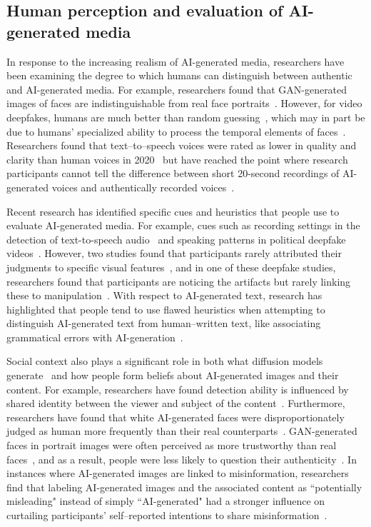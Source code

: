 \subsection{Human perception and evaluation of AI-generated media}

In response to the increasing realism of AI-generated media, researchers have been examining the degree to which humans can distinguish between authentic and AI-generated media. For example, researchers found that GAN-generated images of faces are indistinguishable from real face portraits~\cite{nightingale2022ai, Lago_2022}. However, for video deepfakes, humans are much better than random guessing~\cite{deepfakedetectionbyhumancrowds}, which may in part be due to humans' specialized ability to process the temporal elements of faces~\cite{deepfakedetectionbyhumancrowds, sinha2006face}. Researchers found that text--to--speech voices were rated as lower in quality and clarity than human voices in 2020~\cite{cambre2020choice} but have reached the point where research participants cannot tell the difference between short 20-second recordings of AI-generated voices and authentically recorded voices~\cite{barrington2024people}.

Recent research has identified specific cues and heuristics that people use to evaluate AI-generated media. For example, cues such as recording settings in the detection of text-to-speech audio~\cite{han2024uncovering} and speaking patterns in political deepfake videos~\cite{groh2024human}. However, two studies found that participants rarely attributed their judgments to specific visual features~\cite{hameleers2024they, wohler2021towards}, and in one of these deepfake studies, researchers found that participants are noticing the artifacts but rarely linking these to manipulation~\cite{wohler2021towards}. With respect to AI-generated text, research has highlighted that people tend to use flawed heuristics when attempting to distinguish AI-generated text from human--written text, like associating grammatical errors with AI-generation~\cite{Jakesch2022HumanHF}. 

Social context also plays a significant role in both what diffusion models generate~\cite{luccioni2024stable} and how people form beliefs about AI-generated images and their content. For example, researchers have found detection ability is influenced by shared identity between the viewer and subject of the content~\cite{mink2024s}. Furthermore, researchers have found that white AI-generated faces were disproportionately judged as human more frequently than their real counterparts~\cite{miller2023ai}. GAN-generated faces in portrait images were often perceived as more trustworthy than real faces~\cite{nightingale2022ai}, and as a result, people were less likely to question their authenticity~\cite{Lago_2022}. In instances where AI-generated images are linked to misinformation, researchers find that labeling AI-generated images and the associated content as ``potentially misleading" instead of simply ``AI-generated" had a stronger influence on curtailing participants' self--reported intentions to share misinformation~\cite{epstein2023label, wittenberg2024labeling}.

